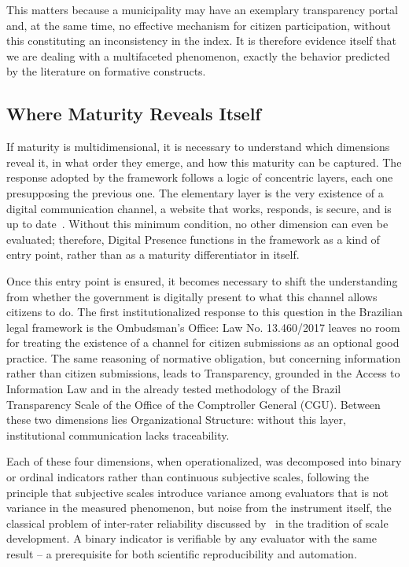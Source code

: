 \documentclass[12pt]{article}
\begin{document}
This matters because a municipality may have an exemplary transparency portal and, at the same time, no effective mechanism for citizen participation, without this constituting an inconsistency in the index. It is therefore evidence itself that we are dealing with a multifaceted phenomenon, exactly the behavior predicted by the literature on formative constructs.

\subsection{Where Maturity Reveals Itself}

If maturity is multidimensional, it is necessary to understand which dimensions reveal it, in what order they emerge, and how this maturity can be captured. The response adopted by the framework follows a logic of concentric layers, each one presupposing the previous one. The elementary layer is the very existence of a digital communication channel, a website that works, responds, is secure, and is up to date~\cite{zahn2024mapping}. Without this minimum condition, no other dimension can even be evaluated; therefore, Digital Presence functions in the framework as a kind of entry point, rather than as a maturity differentiator in itself.

Once this entry point is ensured, it becomes necessary to shift the understanding from whether the government is digitally present to what this channel allows citizens to do. The first institutionalized response to this question in the Brazilian legal framework is the Ombudsman's Office: Law No. 13.460/2017 leaves no room for treating the existence of a channel for citizen submissions as an optional good practice. The same reasoning of normative obligation, but concerning information rather than citizen submissions, leads to Transparency, grounded in the Access to Information Law and in the already tested methodology of the Brazil Transparency Scale of the Office of the Comptroller General (CGU). Between these two dimensions lies Organizational Structure: without this layer, institutional communication lacks traceability.

Each of these four dimensions, when operationalized, was decomposed into binary or ordinal indicators rather than continuous subjective scales, following the principle that subjective scales introduce variance among evaluators that is not variance in the measured phenomenon, but noise from the instrument itself, the classical problem of inter-rater reliability discussed by~\cite{devellis2016} in the tradition of scale development. A binary indicator is verifiable by any evaluator with the same result -- a prerequisite for both scientific reproducibility and automation.
\end{document}
